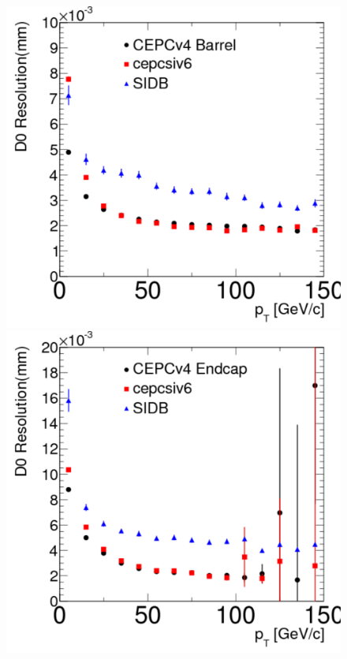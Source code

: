 \begin{figure}[hbtp]
\begin{center}
\includegraphics[width=0.25\textheight,keepaspectratio]{Figures/TrackingSystem/FullSilicon/Plot_muon_D0_PtBarrel.pdf}
\includegraphics[width=0.25\textheight,keepaspectratio]{Figures/TrackingSystem/FullSilicon/Plot_muon_D0_PtEndcap.pdf}

\end{center}
\end{figure}
